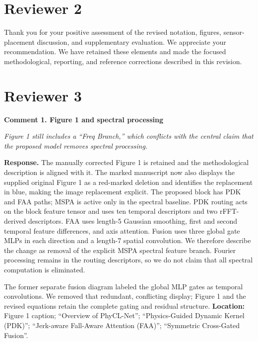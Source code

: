 \documentclass[11pt]{article}
\newcommand{\ReviewerComment}[1]{\textit{#1}\par}
\newcommand{\AuthorResponse}[1]{\textbf{Response.} #1\par}
\newcommand{\ManuscriptChange}[1]{{\small\textbf{Location:} #1}\par}
\newcommand{\commentheading}[1]{\par\medskip\textbf{#1}\par\nopagebreak[4]}
\begin{document}
\section*{Reviewer 2}

Thank you for your positive assessment of the revised notation, figures, sensor-placement discussion, and supplementary evaluation. We appreciate your recommendation. We have retained these elements and made the focused methodological, reporting, and reference corrections described in this revision.

\clearpage
\section*{Reviewer 3}

\commentheading{Comment 1. Figure 1 and spectral processing}
\ReviewerComment{Figure 1 still includes a ``Freq Branch,'' which conflicts with the central claim that the proposed model removes spectral processing.}
\AuthorResponse{The manually corrected Figure 1 is retained and the methodological description is aligned with it. The marked manuscript now also displays the supplied original Figure 1 as a red-marked deletion and identifies the replacement in blue, making the image replacement explicit. The proposed block has PDK and FAA paths; MSPA is active only in the spectral baseline. PDK routing acts on the block feature tensor and uses ten temporal descriptors and two rFFT-derived descriptors. FAA uses length-5 Gaussian smoothing, first and second temporal feature differences, and axis attention. Fusion uses three global gate MLPs in each direction and a length-7 spatial convolution. We therefore describe the change as removal of the explicit MSPA spectral feature branch. Fourier processing remains in the routing descriptors, so we do not claim that all spectral computation is eliminated.}
The former separate fusion diagram labeled the global MLP gates as temporal convolutions. We removed that redundant, conflicting display; Figure 1 and the revised equations retain the complete gating and residual structure.
\ManuscriptChange{Figure 1 caption; ``Overview of PhyCL-Net''; ``Physics-Guided Dynamic Kernel (PDK)''; ``Jerk-aware Fall-Aware Attention (FAA)''; ``Symmetric Cross-Gated Fusion''.}
\end{document}
